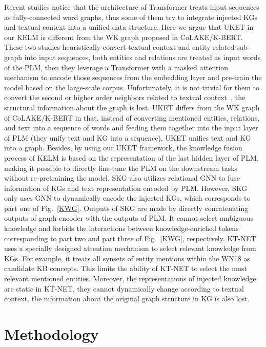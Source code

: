 \documentclass{article} \usepackage{iclr2022_conference,times}
\begin{document}
Recent studies notice that the architecture of Transformer treats input sequences as fully-connected word graphs, thus some of them try to integrate injected KGs and textual context into a unified data structure. Here we argue that UKET in our KELM is different from the WK graph proposed in CoLAKE/K-BERT. These two studies heuristically convert textual context and entity-related sub-graph into input sequences, both entities and relations are treated as input words of the PLM, then they leverage a Transformer with a masked attention mechanism to encode those sequences from the embedding layer and pre-train the model based on the large-scale corpus. Unfortunately, it is not trivial for them to convert the second or higher order neighbors related to textual context~\citep{su2020cokebert}, the structural information about the graph is lost. UKET differs from the WK graph of CoLAKE/K-BERT in that, instead of converting mentioned entities, relations, and text into a sequence of words and feeding them together into the input layer of PLM (they unify text and KG into a sequence), UKET unifies text and KG into a graph. Besides, by using our UKET framework, the knowledge fusion process of KELM is based on the representation of the last hidden layer of PLM, making it possible to directly fine-tune the PLM on the downstream tasks without re-pretraining the model. SKG also utilizes relational GNN to fuse information of KGs and text representation encoded by PLM. However, SKG only uses GNN to dynamically encode the injected KGs, which corresponds to part one of Fig.~\ref{KWG}. Outputs of SKG are made by directly concatenating outputs of graph encoder with the outputs of PLM. It cannot select ambiguous knowledge and forbids the interactions between knowledge-enriched tokens corresponding to part two and part three of Fig.~\ref{KWG}, respectively. KT-NET uses a specially designed attention mechanism to select relevant knowledge from KGs. For example, it treats all synsets of entity mentions within the WN18 as candidate KB concepts.
This limits the ability of KT-NET to select the most relevant mentioned entities. Moreover, the representations of injected knowledge are static in KT-NET, they cannot dynamically change according to textual context, the information about the original graph structure in KG is also lost.

\section{Methodology}
\end{document}
